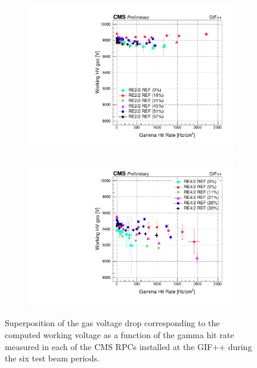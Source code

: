 \begin{figure}[H]
\begin{subfigure}{0.5\linewidth}
    		\includegraphics[width = \linewidth]{fig/chapt5/RE2-2_REF_HVgas_vs_Rate.pdf}
        	\caption{\label{fig:GIFpp_hvgas_vs_rate:C}}
    	\end{subfigure}
    	\begin{subfigure}{0.5\linewidth}
			\centering
    		\includegraphics[width = \linewidth]{fig/chapt5/RE4-2_REF_HVgas_vs_Rate.pdf}
        	\caption{\label{fig:GIFpp_hvgas_vs_rate:D}}
    	\end{subfigure}
		\caption{\label{fig:GIFpp_hvgas_vs_rate} Superposition of the gas voltage drop corresponding to the computed working voltage as a function of the gamma hit rate measured in each of the CMS RPCs installed at the GIF++ during the six test beam periods.}
	\end{figure}
	
